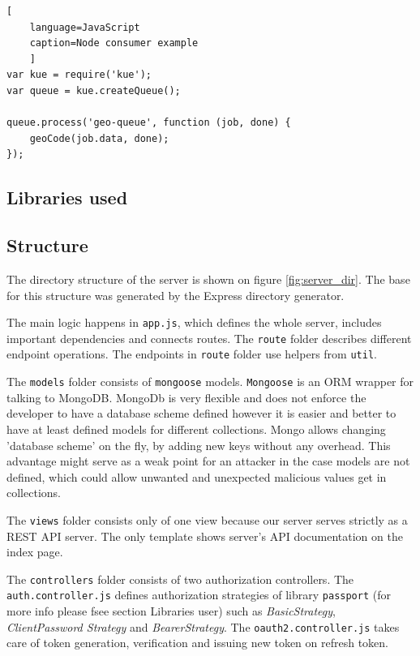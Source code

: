 \documentclass[thesis=M,english]{FITthesis}[2012/10/20]
\begin{document}
\begin{lstlisting}[
	language=JavaScript
	caption=Node consumer example
	]
var kue = require('kue');
var queue = kue.createQueue();

queue.process('geo-queue', function (job, done) {
    geoCode(job.data, done);
});

\end{lstlisting}



\subsection{Libraries used}
\subsection{Structure}

The directory structure of the server is shown on figure \ref{fig:server_dir}. The base for this structure was generated by the Express directory generator. 

The main logic happens in \verb|app.js|, which defines the whole server, includes important dependencies and connects routes.
The \verb|route| folder describes different endpoint operations. The endpoints in \verb|route| folder use helpers from \verb|util|. 

The \verb|models| folder consists of \verb|mongoose| models. \verb|Mongoose| is an ORM wrapper for talking to MongoDB. MongoDb is very flexible and does not enforce the developer to have a database scheme defined however it is easier and better to have at least defined models for different collections. Mongo allows changing 'database scheme' on the fly, by adding new keys without any overhead. This advantage might serve as a weak point for an attacker in the case models are not defined, which could allow unwanted and unexpected malicious values get in collections.

The \verb|views| folder consists only of one view because our server serves strictly as a REST API server. The only template shows server's API documentation on the index page.

The \verb|controllers| folder consists of two authorization controllers. The \verb|auth.controller.js| defines authorization strategies of library \verb|passport| (for more info please fsee section Libraries user) such as \textit{BasicStrategy}, \textit{ClientPassword Strategy} and \textit{BearerStrategy}. The \verb|oauth2.controller.js| takes care of token generation, verification and issuing new token on refresh token.
\end{document}
